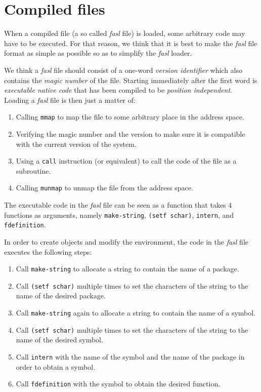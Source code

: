 \chapter{Compiled files}
\label{chap-compiled-files}

When a compiled file (a so called \emph{fasl} file) is loaded, some
arbitrary code may have to be executed.  For that reason, we think
that it is best to make the \emph{fasl} file format as simple as
possible so as to simplify the \emph{fasl} loader.

We think a \emph{fasl} file should consist of a one-word \emph{version
  identifier} which also contains the \emph{magic number} of the
file.  Starting immediately after the first word is \emph{executable
  native code} that has been compiled to be \emph{position
  independent}.  Loading a \emph{fasl} file is then just a matter of:

\begin{enumerate}
\item Calling \texttt{mmap} to map the file to some arbitrary place in
  the address space.
\item Verifying the magic number and the version to make sure it is
  compatible with the current version of the system. 
\item Using a \texttt{call} instruction (or equivalent) to call the
  code of the file as a subroutine.
\item Calling \texttt{munmap} to unmap the file from the address
  space. 
\end{enumerate}

The executable code in the \emph{fasl} file can be seen as a \cl{}
function that takes 4 functions as arguments, namely
\texttt{make-string}, \texttt{(setf schar)}, \texttt{intern}, and
\texttt{fdefinition}.

In order to create objects and modify the environment, the code in the
\emph{fasl} file executes the following steps:

\begin{enumerate}
\item Call \texttt{make-string} to allocate a string to contain the
  name of a package.
\item Call \texttt{(setf schar)} multiple times to set the characters
  of the string to the name of the desired package.
\item Call \texttt{make-string} again to allocate a string to contain
  the name of a symbol.
\item Call \texttt{(setf schar)} multiple times to set the characters
  of the string to the name of the desired symbol.
\item Call \texttt{intern} with the name of the symbol and the name of
  the package in order to obtain a symbol.
\item Call \texttt{fdefinition} with the symbol to obtain the desired
  function. 
\end{enumerate}

